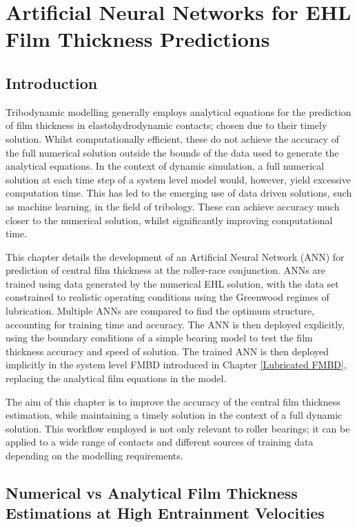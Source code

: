 \chapter{Artificial Neural Networks for EHL Film Thickness Predictions}
\label{ANN Lubricated Bearing FMBD}

\section{Introduction}

Tribodynamic modelling generally employs analytical equations for the prediction of film thickness in elastohydrodynamic contacts; chosen due to their timely solution. Whilst computationally efficient, these do not achieve the accuracy of the full numerical solution outside the bounds of the data used to generate the analytical equations. In the context of dynamic simulation, a full numerical solution at each time step of a system level model would, however, yield excessive computation time. This has led to the emerging use of data driven solutions, such as machine learning, in the field of tribology. These can achieve accuracy much closer to the numerical solution, whilst significantly improving computational time.

This chapter details the development of an Artificial Neural Network (ANN) for prediction of central film thickness at the roller-race conjunction. ANNs are trained using data generated by the numerical EHL solution, with the data set constrained to realistic operating conditions using the Greenwood regimes of lubrication. Multiple ANNs are compared to find the optimum structure, accounting for training time and accuracy. The ANN is then deployed explicitly, using the boundary conditions of a simple bearing model to test the film thickness accuracy and speed of solution. The trained ANN is then deployed implicitly in the system level FMBD introduced in Chapter \ref{Lubricated FMBD}, replacing the analytical film equations in the model.

The aim of this chapter is to improve the accuracy of the central film thickness estimation, while maintaining a timely solution in the context of a full dynamic solution. This workflow employed is not only relevant to roller bearings; it can be applied to a wide range of contacts and different sources of training data depending on the modelling requirements.

\section{Numerical vs Analytical Film Thickness Estimations at High Entrainment Velocities} 
\label{Numerical vs Analytical Film Thickness Estimations at High Entrainment Velocities}

